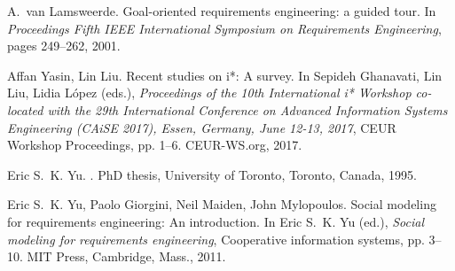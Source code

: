 \documentclass[11pt,a4paper]{article}
\begin{document}
\begin{thebibliography}{xxx}
 A.~{van Lamsweerde}.  \newblock Goal-oriented
  requirements engineering: a guided tour.  \newblock In {\em Proceedings
    Fifth IEEE International Symposium on Requirements Engineering}, pages
  249--262, 2001.

 Affan Yasin, Lin Liu.  \newblock Recent studies on i*: A
  survey.  \newblock In Sepideh Ghanavati, Lin Liu, Lidia L{\'o}pez (eds.),
  {\em Proceedings of the 10th International i* Workshop co-located with the
    29th International Conference on Advanced Information Systems Engineering
    (CAiSE 2017), Essen, Germany, June 12-13, 2017}, CEUR Workshop
  Proceedings, pp. 1--6. CEUR-WS.org, 2017.

 Eric S.~K. Yu.  .  \newblock PhD thesis, {University
  of Toronto}, Toronto, Canada, 1995.

 Eric S.~K. Yu, Paolo Giorgini, Neil Maiden, John
  Mylopoulos.  \newblock Social modeling for requirements engineering: An
  introduction.  \newblock In Eric S.~K. Yu (ed.), {\em Social modeling for
    requirements engineering}, Cooperative information systems, pp.  3--10.
  {MIT Press}, Cambridge, Mass., 2011.
\end{thebibliography}
\end{document}
